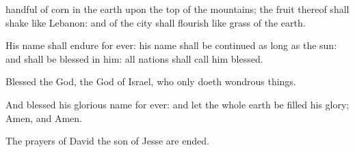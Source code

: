 {handful of
corn in the
earth upon the
top of the
mountains; the
fruit thereof shall
shake like
Lebanon: and
{} of the
city shall
flourish like
grass of the
earth.
\par }{\Q {}His
name shall endure for
ever: his
name shall be
continued as long
as the
sun: and
{} shall be
blessed in him: all
nations shall call him
blessed.
\par }{\BB \par }{\Q {}Blessed
{} the
{}
God, the
God of
Israel, who only
doeth wondrous
things.
\par }{\Q {}And
blessed
{} his
glorious
name for
ever: and let the whole
earth be
filled
{} his
glory;
Amen, and
Amen.
\par }{\Q {}The
prayers of
David the
son of
Jesse are
ended.

}
